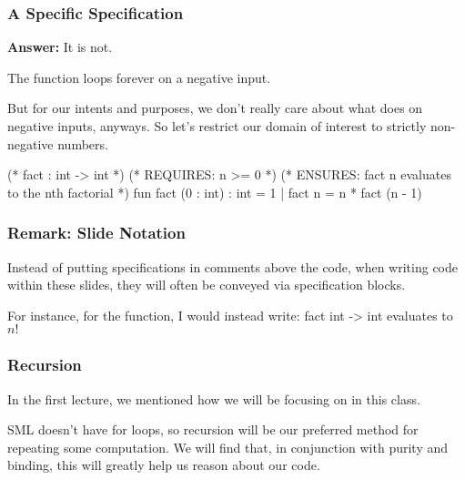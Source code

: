 \documentclass[aspectratio=169]{beamer}
\begin{document}
\begin{frame}[fragile]
  \frametitle{A Specific Specification}

  \textbf{Answer:} It is not.

  \pause
  \vspace{\fill}

  The  function loops forever on a negative input.

  \pause
  \vspace{\fill}

  But for our intents and purposes, we don't really
  care about what  does on negative inputs, anyways. So 
  let's restrict our domain of interest to strictly non-negative
  numbers.

  \pause
  \vspace{\fill}

  \begin{codeblock}
    (* fact : int -> int *)
    (* REQUIRES: n >= 0 *)
    (* ENSURES: fact n evaluates to the nth factorial *)
    fun fact (0 : int) : int = 1
      | fact n = n * fact (n - 1)
  \end{codeblock}

  \pause
\end{frame}

\begin{frame}[fragile]
  \frametitle{Remark: Slide Notation}

  Instead of putting specifications in comments above the code, when
  writing code within these slides, they will often be conveyed via
  specification blocks.

  For instance, for the  function, I would instead write:
  \spec
    {fact}
    {int -> int}
    {}
    { evaluates to $n!$}
\end{frame}


\begin{frame}[fragile]
  \frametitle{Recursion}

  In the first lecture, we mentioned how we will be focusing on
   in this class.

  \pause
  \vspace{\fill}


  \pause
  \vspace{5pt}


  \pause
  \vspace{\fill}

  SML doesn't have for loops, so recursion will be our preferred method
  for repeating some computation. We will find that, in conjunction with
  purity and binding, this will greatly help us reason about our code. 
\end{frame}
\end{document}
